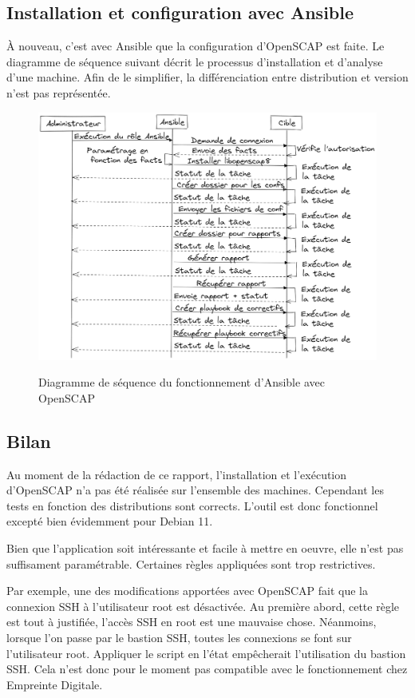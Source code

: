 \documentclass[12pt, a4paper, twoside]{article}
\begin{document}
\subsection{Installation et configuration avec Ansible}
À nouveau, c'est avec \gls{Ansible} que la configuration d'\gls{OpenSCAP} est faite. 
Le diagramme de séquence suivant décrit le processus d'installation et d'analyse d'une machine.
Afin de le simplifier, la différenciation entre distribution et version n'est pas représentée.

\begin{figure}[!ht]
    \centering
    \includegraphics[width=\textwidth]{src/graph_ansible_oscap.png}
    \label{fig:ansible_oscap}
    \caption{Diagramme de séquence du fonctionnement d'\gls{Ansible} avec \gls{OpenSCAP}}
\end{figure}

\newpage
\subsection{Bilan}
Au moment de la rédaction de ce rapport, l'installation et l'exécution d'\gls{OpenSCAP} n'a pas été réalisée sur l'ensemble des machines. 
Cependant les tests en fonction des distributions sont corrects. 
L'outil est donc fonctionnel excepté bien évidemment pour Debian 11.

Bien que l'application soit intéressante et facile à mettre en oeuvre, elle n'est pas suffisament paramétrable.
Certaines règles appliquées sont trop restrictives.

Par exemple, une des modifications apportées avec \gls{OpenSCAP} fait que la connexion SSH à l'utilisateur root est désactivée.
Au première abord, cette règle est tout à justifiée, l'accès SSH en root est une mauvaise chose.
Néanmoins, lorsque l'on passe par le \gls{bastion SSH}, toutes les connexions se font sur l'utilisateur root.
Appliquer le script en l'état empêcherait l'utilisation du \gls{bastion SSH}.
Cela n'est donc pour le moment pas compatible avec le fonctionnement chez Empreinte Digitale.
\end{document}
